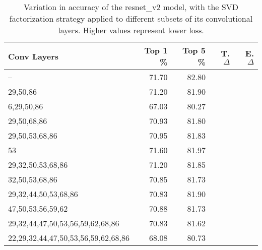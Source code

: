 \begin{table}
\centering
\begin{tabular}{|l|r|r|r|r|}
\hline
Conv Layers & Top 1 \% & Top 5 \% & T. $\Delta$ & E. $\Delta$ \\\hline
-- & 71.70 & 82.80 &  & \\\hline
29,50,86 & 71.20 & 81.90 &  &  \\\hline
6,29,50,86 & 67.03 & 80.27 &  &  \\\hline
29,50,68,86 & 70.93 & 81.80 &  &  \\\hline
29,50,53,68,86 & 70.95 & 81.83 &  &  \\\hline
53 & 71.60 & 81.97 &  & \\\hline
29,32,50,53,68,86 & 71.20 & 81.85 &  &  \\\hline
32,50,53,68,86 & 70.85 & 81.73 &  &  \\\hline
29,32,44,50,53,68,86 & 70.83 & 81.90 &  &  \\\hline
47,50,53,56,59,62 & 70.88 & 81.73 &  &  \\\hline
29,32,44,47,50,53,56,59,62,68,86 & 70.83 & 81.62 &  &  \\\hline
22,29,32,44,47,50,53,56,59,62,68,86 & 68.08 & 80.73 &  &  \\\hline
\end{tabular}
\caption{Variation in accuracy of the resnet\_v2 model, with the SVD factorization strategy applied to different subsets of its convolutional layers. Higher values represent lower loss.}
\label{resnet_v2-accuracy}
\end{table}
